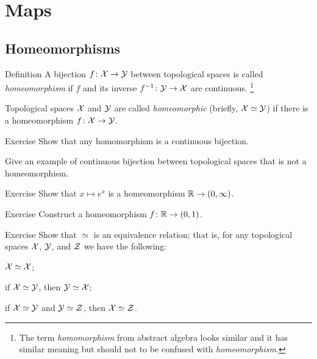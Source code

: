 \chapter{Maps}



\section{Homeomorphisms}

\begin{thm}{Definition}\label{def:homeo}
A bijection $f\colon\mathcal{X}\to\mathcal{Y}$ between topological spaces 
is called \emph{homeomorphism} if $f$ and its inverse $f^{-1}\colon\mathcal{Y}\to\mathcal{X}$
are continuous.%
\footnote{The term \textit{homomorphism} from abstract algebra looks similar and it has similar meaning but should not to be confused with \textit{homeomorphism}.}

Topological spaces $\mathcal{X}$ and $\mathcal{Y}$ are called \emph{homeomorphic} (briefly, $\mathcal{X}\simeq\mathcal{Y}$) if there is a homeomorphism $f\colon\mathcal{X}\to\mathcal{Y}$.
\end{thm}


\begin{thm}{Exercise}\label{ex:bijection-ne-homeo}
Show that any homomorphism is a continuous bijection.

Give an example of continuous bijection between topological spaces that is not a homeomorphism.
\end{thm}

\begin{thm}{Exercise}\label{ex:exp}
Show that $x\mapsto e^x$ is a homeomorphism $\mathbb{R}\to (0,\infty)$.
\end{thm}

\begin{thm}{Exercise}\label{ex:arctan}
Construct a homeomorphism $f\colon\mathbb{R}\to (0,1)$.
\end{thm}

\begin{thm}{Exercise}\label{ex:homeo=eq}
Show that $\simeq$ is an equivalence relation;
that is, for any topological spaces $\mathcal{X}$, $\mathcal{Y}$, and $\mathcal{Z}$ we have the following:
\begin{subthm}{}
$\mathcal{X}\simeq\mathcal{X}$;
\end{subthm}

\begin{subthm}{}
if $\mathcal{X}\simeq\mathcal{Y}$, then $\mathcal{Y}\simeq\mathcal{X}$;
\end{subthm}

\begin{subthm}{}
if $\mathcal{X}\simeq\mathcal{Y}$ and $\mathcal{Y}\simeq\mathcal{Z}$, then $\mathcal{X}\simeq\mathcal{Z}$.
\end{subthm}

\end{thm}

